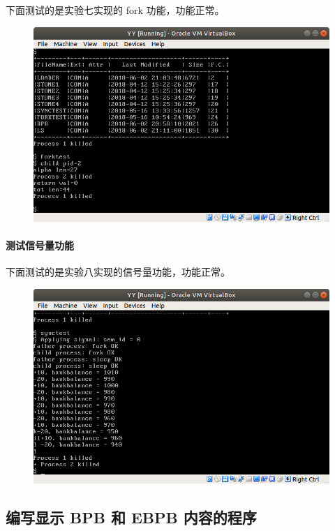 \documentclass[a4paper]{article}
\begin{document}
下面测试的是实验七实现的 fork 功能，功能正常。

\begin{figure}[!hbp]
\centering
\includegraphics[scale=0.5]{pics/10.png}
\end{figure}

\paragraph{测试信号量功能}

下面测试的是实验八实现的信号量功能，功能正常。

\begin{figure}[!hbp]
\centering
\includegraphics[scale=0.5]{pics/11.png}
\end{figure}

\subsection{编写显示 BPB 和 EBPB 内容的程序}
\end{document}
